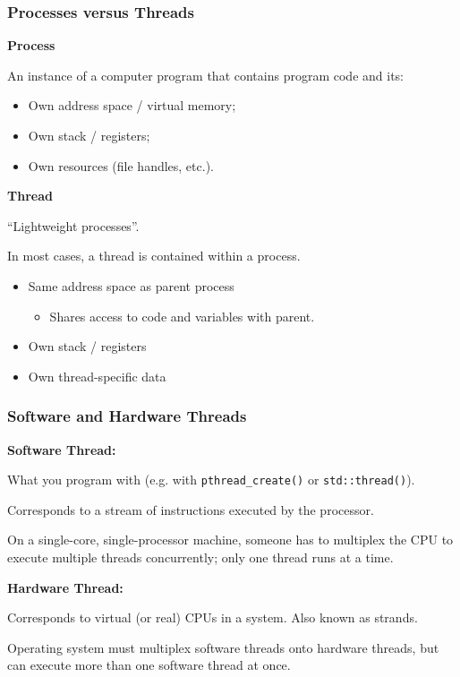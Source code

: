 \documentclass[aspectratio=43]{beamer}
\newenvironment{changemargin}[1]{%
  \begin{list}{}{%
    \setlength{\topsep}{0pt}%
    \setlength{\leftmargin}{#1}%
    \setlength{\rightmargin}{1em}
    \setlength{\listparindent}{\parindent}%
    \setlength{\itemindent}{\parindent}%
    \setlength{\parsep}{\parskip}%
  }%
  \item[]}{\end{list}}
\begin{document}
\begin{frame}
  \frametitle{Processes versus Threads}

\begin{changemargin}{2.5cm}
  {\bf Process}

  An instance of a computer program that contains program code and its:

  \begin{itemize}
    \item Own address space / virtual memory;
    \item Own stack / registers;
    \item Own resources (file handles, etc.).
  \end{itemize}
  \vfill
  {\bf Thread}

  ``Lightweight processes''. 

  In most cases, a thread is contained within a process.

  \begin{itemize}
    \item Same address space as parent process
      \begin{itemize}
        \item Shares access to code and variables with parent.
      \end{itemize}
    \item Own stack / registers
    \item Own thread-specific data
  \end{itemize}

\end{changemargin}

\end{frame}

\begin{frame}
  \frametitle{Software and Hardware Threads}

\begin{changemargin}{2.5cm}
  {\bf Software Thread:}

  What you program with (e.g. with {\tt pthread\_create()} or {\tt std::thread()}). \vfill

  Corresponds to a stream of instructions executed by the processor. \vfill

  On a single-core, single-processor machine, someone has to multiplex the CPU to
  execute multiple threads concurrently; only one thread runs at a time.

  \vfill
  {\bf Hardware Thread:}

  Corresponds to virtual (or real) CPUs in a system. Also known as strands. \vfill

  Operating system must multiplex software threads onto hardware threads, but 
  can execute more than one software thread at once.

\end{changemargin}

\end{frame}
\end{document}
